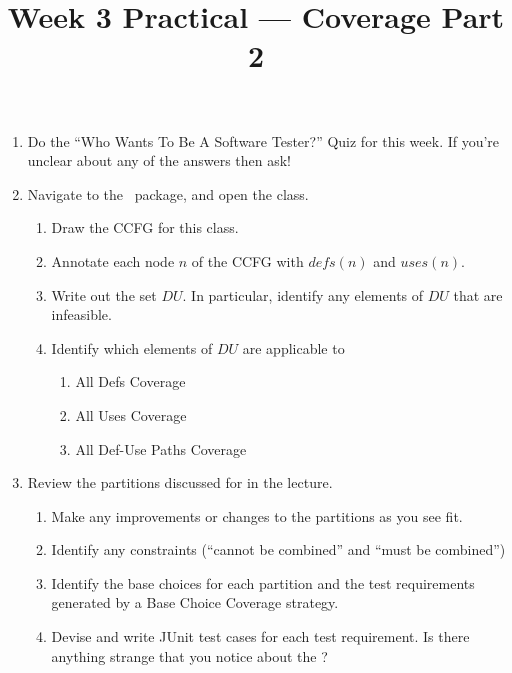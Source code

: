 



\title{Week 3 Practical --- Coverage Part 2}

\begin{enumerate}

    \item Do the ``Who Wants To Be A Software Tester?'' Quiz for this week.
    If you're unclear about any of the answers then ask!

    \item Navigate to the \examplespackage~package, and open the
    \spacedefenderclass class. 

        \begin{enumerate}

            \item Draw the CCFG for this class.
            
            \item Annotate each node $n$ of the CCFG with $\mathit{defs}(n)$ and 
            $\mathit{uses}(n)$.

            \item Write out the set $\mathit{DU}$. In particular, identify any
            elements of $\mathit{DU}$ that are infeasible.
            
            \item Identify which elements of $\mathit{DU}$ are applicable to 
            
            \begin{enumerate}
                \item All Defs Coverage
                \item All Uses Coverage
                \item All Def-Use Paths Coverage
            \end{enumerate}            
            
        \end{enumerate}

    \item Review the partitions discussed for \triangleclass in the lecture.
    
    \begin{enumerate}
        \item Make any improvements or changes to the partitions as you see fit.
        
        \item Identify any constraints (``cannot be combined'' and ``must be combined'')
        
        \item Identify the base choices for each partition and the test
        requirements generated by a Base Choice Coverage strategy.

        \item Devise and write JUnit test cases for each test requirement. Is
        there anything strange that you notice about the \triangleclass?
    \end{enumerate}
        

\end{enumerate}

